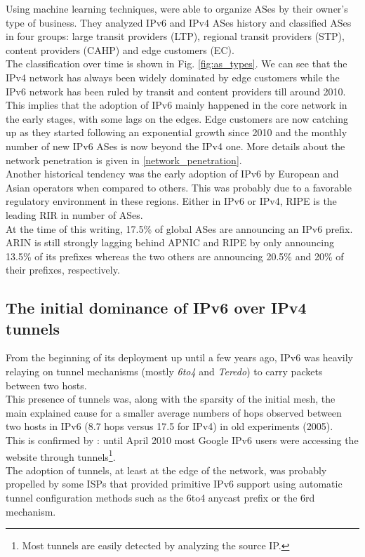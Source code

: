\documentclass[journal]{IEEEtran}
\begin{document}
Using machine learning techniques, \cite{paper4} were able to organize ASes by
their owner's type of business. They analyzed IPv6 and IPv4 ASes history
and classified ASes in four groups: large transit providers (LTP), regional
transit providers (STP), content providers (CAHP) and edge customers (EC). \\
The classification over time is shown in Fig. \ref{fig:as_types}. We can see
that the IPv4 network has always been widely dominated by edge customers while
the IPv6 network has been ruled by transit and content providers till around
2010. This implies that the adoption of IPv6 mainly happened in the core network
in the early stages, with some lags on the edges. Edge customers are now
catching up as they started following an exponential growth since 2010 and the
monthly number of new IPv6 ASes is now beyond the IPv4 one. More details about
the network penetration is given in \ref{network_penetration}. \\
Another historical tendency was the early adoption of IPv6 by European and Asian
operators when compared to others. This was probably due to a favorable
regulatory environment in these regions. Either in IPv6 or IPv4, RIPE is the
leading RIR in number of ASes. \\
At the time of this writing, 17.5\% of global ASes are announcing an IPv6
prefix. ARIN is still strongly lagging behind APNIC and RIPE by only announcing
13.5\% of its prefixes whereas the two others are announcing 20.5\% and 20\% of
their prefixes, respectively\cite{ripe:ipv6stats}.

\subsection{The initial dominance of IPv6 over IPv4 tunnels}
\label{tunnels}

From the beginning of its deployment up until a few years ago, IPv6 was heavily
relaying on tunnel mechanisms (mostly \textit{6to4} and \textit{Teredo}) to
carry packets between two hosts. \\
This presence of tunnels was, along with the sparsity of the initial mesh, the
main explained cause for a smaller average numbers of hops observed between two
hosts in IPv6 (8.7 hops versus 17.5 for IPv4) in old \cite{paper1} experiments
(2005). \\ This is confirmed by \cite{google:ipv6} : until April 2010 most
Google IPv6 users were accessing the website through tunnels\footnote{
Most tunnels are easily detected by analyzing the source IP.}. \\
The adoption of tunnels, at least at the edge of the network, was probably
propelled by some ISPs\cite{free:6rd} that provided primitive IPv6 support using
automatic tunnel configuration methods such as the 6to4 anycast
prefix\cite{rfc:3068} or the 6rd mechanism\cite{rfc:5569}.
\end{document}
